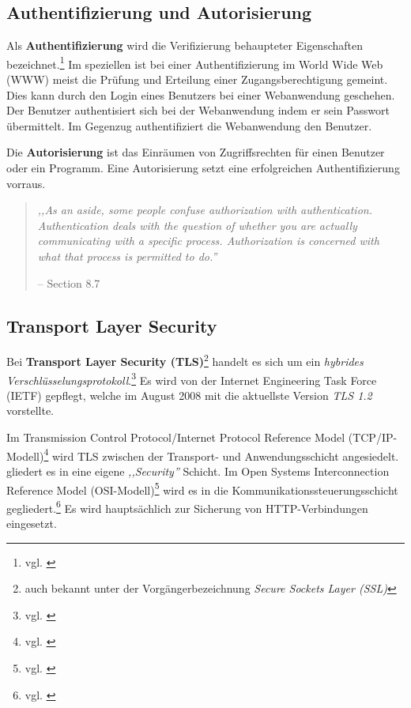 \documentclass[12pt,a4paper,pointednumbers,abstracton]{scrartcl}
\begin{document}
\subsection{Authentifizierung und Autorisierung}

Als \textbf{Authentifizierung} wird die Verifizierung behaupteter Eigenschaften bezeichnet.\footnote{vgl. \cite[Section 8.7]{TW10}}
Im speziellen ist bei einer Authentifizierung im World Wide Web (WWW) meist die Prüfung und Erteilung einer Zugangsberechtigung gemeint.
Dies kann durch den Login eines Benutzers bei einer Webanwendung geschehen.
Der Benutzer authentisiert sich bei der Webanwendung indem er sein Passwort übermittelt.
Im Gegenzug authentifiziert die Webanwendung den Benutzer.

Die \textbf{Autorisierung} ist das Einräumen von Zugriffsrechten für einen Benutzer oder ein Programm.
Eine Autorisierung setzt eine erfolgreichen Authentifizierung vorraus.

\begin{quote}
\emph{,,As an aside, some people confuse authorization with authentication.
Authentication deals with the question of whether you are actually communicating with a specific process.
Authorization is concerned with what that process is permitted to do.''}
\begin{flushright}
\small{-- \cite{TW10} Section 8.7}
\end{flushright}
\end{quote}

\subsection{Transport Layer Security}

Bei \textbf{Transport Layer Security (TLS)}\footnote{auch bekannt unter der Vorgängerbezeichnung \emph{Secure Sockets Layer (SSL)}} handelt es sich um ein \emph{hybrides Verschlüsselungsprotokoll}.\footnote{vgl. \cite[Hannes Federrath, Andreas Pfitzmann: ,,IT-Sicherheit''. Kapitel 2.4 (S. 279-281)]{WK06}}
Es wird von der Internet Engineering Task Force (IETF) gepflegt, welche im August 2008 mit \cite{RFC5246} die aktuellste Version \emph{TLS 1.2} vorstellte.

Im Transmission Control Protocol/Internet Protocol Reference Model (TCP/IP-Modell)\footnote{vgl. \cite[Section 1.4.2]{TW10}} wird TLS zwischen der Transport- und Anwendungsschicht angesiedelt.
\cite[Section 8.9.3]{TW10} gliedert es in eine eigene \emph{,,Security''} Schicht.
Im Open Systems Interconnection Reference Model (OSI-Modell)\footnote{vgl. \cite[Section 1.4.1]{TW10}} wird es in die Kommunikationssteuerungsschicht gegliedert.\footnote{vgl. \cite[Section 12.4]{Sin12}}
Es wird hauptsächlich zur Sicherung von HTTP-Verbindungen eingesetzt.
\end{document}
